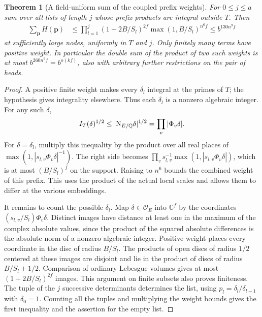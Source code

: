 \documentclass[a4paper,11pt]{article}
\newtheorem{theorem}[proposition]{Theorem}
\theoremstyle{definition}
\theoremstyle{remark}
\numberwithin{equation}{section}
\begin{document}
\begin{theorem}[A field-uniform sum of the coupled prefix weights]
\leavevmode\label{thm:prefixpack928}
For \(0\le j\le a\) sum over all lists of length \(j\) whose
prefix products are integral outside \(T\). Then
\begin{align}
 \sum_{\mathbf p} H(\mathbf p)
 &\le \prod_{l=1}^{j}
       (1+2B/S_l)^{2f}\max(1,B/S_l)^{n^6 f}
 \le b^{130n^9 f}
 \label{eq:prefixpack928}
\end{align}
at sufficiently large nodes, uniformly in \(T\) and \(j\).
Only finitely many terms have positive weight. In particular the
double sum of the product of two such weights is at most
\(b^{260n^9f}=b^{o(kf)}\), also with arbitrary further restrictions
on the pair of heads.
\end{theorem}
\begin{proof}
A positive finite weight makes every \(\delta_l\) integral at
the primes of \(T\); the hypothesis gives integrality elsewhere.
Thus each \(\delta_l\) is a nonzero algebraic integer.
For any such \(\delta\),
\[
 I_T(\delta)^{1/2}\le |{\rm N}_{E/\mathbb Q}\delta|^{1/2}
                         =\prod_v|\Phi_v\delta|.
\]
For \(\delta=\delta_l\), multiply this inequality by the
product over all real places of
\(\max(1,|s_{l,v}\Phi_v\delta|^{-1})\). The right side becomes
\(\prod_v s_{l,v}^{-1}\max(1,|s_{l,v}\Phi_v\delta|)\), which is
at most \((B/S_l)^f\) on the support. Raising to \(n^6\) bounds
the combined weight of this prefix. This uses the product of
the actual local scales and allows them to differ at the
various embeddings.

It remains to count the possible \(\delta_l\). Map
\(\delta\in\mathcal O_E\) into \(\mathbb C^f\) by the coordinates
\((s_{l,v}/S_l)\Phi_v\delta\). Distinct images have distance at
least one in the maximum of the complex absolute values, since
the product of the squared absolute differences is the absolute
norm of a nonzero algebraic integer. Positive weight places
every coordinate in the disc of radius \(B/S_l\). The products
of open discs of radius \(1/2\) centered at these images are
disjoint and lie in the product of discs of radius \(B/S_l+1/2\).
Comparison of ordinary Lebesgue volumes gives at most
\((1+2B/S_l)^{2f}\) images. This argument on finite subsets
also proves finiteness. The tuple of the \(j\) successive
determinants determines the list, using \(p_l=\delta_l/\delta_{l-1}\)
with \(\delta_0=1\). Counting all the tuples and multiplying the
weight bounds gives the first inequality and the assertion for
the empty list.


\end{proof}
\end{document}
